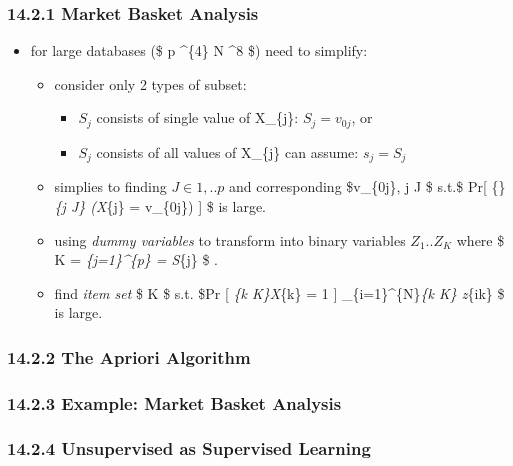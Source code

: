 \documentclass[11pt]{article}
\providecommand{\tightlist}{%
      \setlength{\itemsep}{0pt}\setlength{\parskip}{0pt}}
\begin{document}
\subsubsection{14.2.1 Market Basket
Analysis}\label{market-basket-analysis}

\begin{itemize}
\tightlist
\item
  for large databases (\$ p \^{}\{4\} N \^{}8 \$)
  need to simplify:

  \begin{itemize}
  \tightlist
  \item
    consider only 2 types of subset:

    \begin{itemize}
    \tightlist
    \item
      \(S_{j}\) consists of single value of X\_\{j\}:
      \(S_{j} = v_{0j}\), or
    \item
      \(S_{j}\) consists of all values of X\_\{j\} can assume:
      \(s_{j} = S_{j}\)
    \end{itemize}
  \item
    simplies to finding \(J \in {1,..p}\) and corresponding \$v\_\{0j\},
    j \in J \$ s.t.\$ Pr{[} \{\bigcap\}\emph{\{j \in J\} (X}\{j\} =
    v\_\{0j\}) {]} \$ is large.
  \item
    using \emph{dummy variables} to transform into binary variables
    \(Z_{1}..Z_{K}\) where \$ K = \sum\emph{\{j=1\}\^{}\{p\} =
    \textbar{}S}\{j\}\textbar{} \$ .
  \item
    find \emph{item set} \$ K  \$ s.t. \$Pr {[}
    \prod\emph{\{k \in K\}X}\{k\} = 1 {]} \approx {}
    \sum\_\{i=1\}\^{}\{N\}\prod\emph{\{k \in K\} z}\{ik\} \$ is large.
  \end{itemize}
\end{itemize}

\subsubsection{14.2.2 The Apriori
Algorithm}\label{the-apriori-algorithm}

\subsubsection{14.2.3 Example: Market Basket
Analysis}\label{example-market-basket-analysis}

\subsubsection{14.2.4 Unsupervised as Supervised
Learning}\label{unsupervised-as-supervised-learning}
\end{document}
